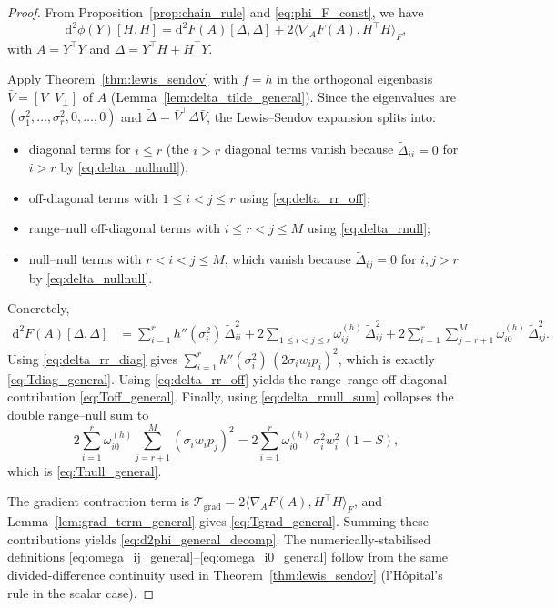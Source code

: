 
\begin{proof}
From Proposition~\ref{prop:chain_rule} and \eqref{eq:phi_F_const}, we have
\begin{equation}
\mathrm{d}^2 \phi(Y)[H,H] = \mathrm{d}^2 F(A)[\Delta,\Delta] + 2\langle \nabla_A F(A), H^\top H\rangle_F,
\end{equation}
with $A=Y^\top Y$ and $\Delta=Y^\top H + H^\top Y$.

Apply Theorem~\ref{thm:lewis_sendov} with $f=h$ in the orthogonal eigenbasis $\bar V=[V\;\;V_\perp]$ of $A$ (Lemma~\ref{lem:delta_tilde_general}). Since the eigenvalues are $(\sigma_1^2,\ldots,\sigma_r^2,0,\ldots,0)$ and $\tilde\Delta=\bar V^\top \Delta \bar V$, the Lewis--Sendov expansion splits into:
\begin{itemize}
\item diagonal terms for $i\leq r$ (the $i>r$ diagonal terms vanish because $\tilde\Delta_{ii}=0$ for $i>r$ by \eqref{eq:delta_nullnull});
\item off-diagonal terms with $1\leq i<j\leq r$ using \eqref{eq:delta_rr_off};
\item range--null off-diagonal terms with $i\leq r<j\leq M$ using \eqref{eq:delta_rnull};
\item null--null terms with $r<i<j\leq M$, which vanish because $\tilde\Delta_{ij}=0$ for $i,j>r$ by \eqref{eq:delta_nullnull}.
\end{itemize}
Concretely,
\begin{align}
\mathrm{d}^2 F(A)[\Delta,\Delta]
&= \sum_{i=1}^{r} h''(\sigma_i^2)\,\tilde\Delta_{ii}^2
+ 2\sum_{1\leq i<j\leq r} \omega_{ij}^{(h)}\,\tilde\Delta_{ij}^2
+ 2\sum_{i=1}^{r}\sum_{j=r+1}^{M} \omega_{i0}^{(h)}\,\tilde\Delta_{ij}^2.
\end{align}
Using \eqref{eq:delta_rr_diag} gives $\sum_{i=1}^{r} h''(\sigma_i^2)\,(2\sigma_i w_i p_i)^2$, which is exactly \eqref{eq:Tdiag_general}.
Using \eqref{eq:delta_rr_off} yields the range--range off-diagonal contribution \eqref{eq:Toff_general}.
Finally, using \eqref{eq:delta_rnull_sum} collapses the double range--null sum to
\begin{equation}
2\sum_{i=1}^{r}\omega_{i0}^{(h)} \sum_{j=r+1}^{M} (\sigma_i w_i p_j)^2
= 2\sum_{i=1}^{r}\omega_{i0}^{(h)}\,\sigma_i^2 w_i^2\,(1-S),
\end{equation}
which is \eqref{eq:Tnull_general}.

The gradient contraction term is $\mathcal{T}_{\mathrm{grad}}=2\langle \nabla_A F(A),H^\top H\rangle_F$, and Lemma~\ref{lem:grad_term_general} gives \eqref{eq:Tgrad_general}. Summing these contributions yields \eqref{eq:d2phi_general_decomp}.  The numerically-stabilised definitions \eqref{eq:omega_ij_general}--\eqref{eq:omega_i0_general} follow from the same divided-difference continuity used in Theorem~\ref{thm:lewis_sendov} (l'H\^{o}pital's rule in the scalar case).
\end{proof}

